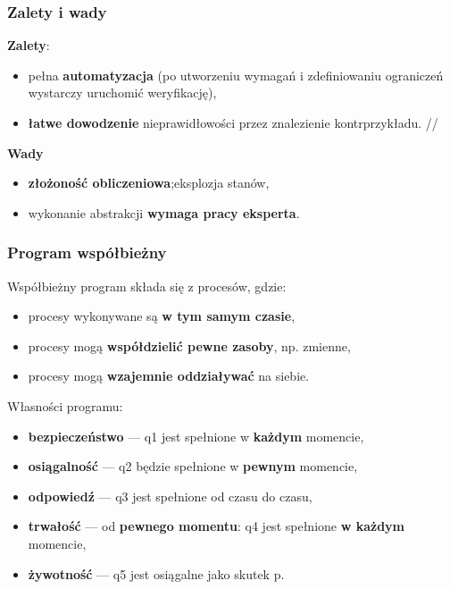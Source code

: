 \subsubsection{Zalety i wady}

\textbf{Zalety}:

\begin{itemize}
	\item pełna \textbf{automatyzacja} (po utworzeniu wymagań i zdefiniowaniu ograniczeń wystarczy uruchomić weryfikację),
	\item \textbf{łatwe dowodzenie} nieprawidłowości przez znalezienie kontrprzykładu. //
\end{itemize}

\textbf{Wady}

\begin{itemize}
	\item \textbf{złożoność obliczeniowa};eksplozja stanów,
	\item wykonanie abstrakcji \textbf{wymaga pracy eksperta}.
\end{itemize}

\subsubsection{Program współbieżny}

Współbieżny program składa się z procesów, gdzie:
\begin{itemize}
	\item procesy wykonywane są \textbf{w tym samym czasie},
	\item procesy mogą \textbf{współdzielić pewne zasoby}, np. zmienne,
	\item procesy mogą \textbf{wzajemnie oddziaływać} na siebie. \\
\end{itemize}

Własności programu:
\begin{itemize}
	\item \textbf{bezpieczeństwo} — q1 jest spełnione w \textbf{każdym} momencie,
	\item \textbf{osiągalność} — q2 będzie spełnione w \textbf{pewnym} momencie,
	\item \textbf{odpowiedź} — q3 jest spełnione od czasu do czasu,
	\item \textbf{trwałość} — od \textbf{pewnego momentu}: q4 jest spełnione \textbf{w każdym} momencie,
	\item \textbf{żywotność} — q5 jest osiągalne jako skutek p.
\end{itemize}


